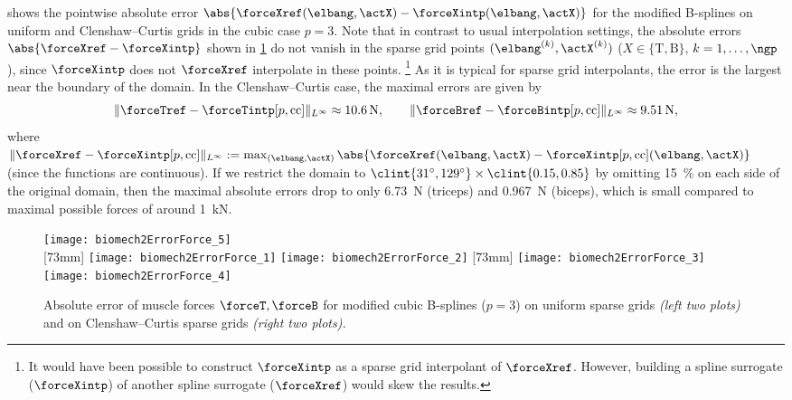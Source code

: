  shows the pointwise absolute error
$\abs{\forceXref(\elbang, \actX) - \forceXintp(\elbang, \actX)}$
for the modified B-splines on uniform and Clenshaw--Curtis grids
in the cubic case $p = 3$.
Note that in contrast to usual interpolation settings,
the absolute errors $\abs{\forceXref - \forceXintp}$
shown in \cref{fig:biomech2ErrorForce} do not vanish in the
sparse grid points $(\elbang^{(k)}, \actX^{(k)})$
($X \in \{\mathrm{T}, \mathrm{B}\}$, $k = 1, \dotsc, \ngp$),
since $\forceXintp$ does not $\forceXref$ interpolate
in these points.%
\footnote{%
  It would have been possible to construct $\forceXintp$
  as a sparse grid interpolant of $\forceXref$.
  However, building a spline surrogate ($\forceXintp$)
  of another spline surrogate ($\forceXref$) would skew the results.%
}
As it is typical for sparse grid interpolants,
the error is the largest near the boundary of the domain.
In the Clenshaw--Curtis case, the maximal errors are given by
\begin{equation}
  \norm[\Linfty]{\forceTref - \forceTintp[p,\cc]}
  \approx \SI{10.6}{\newton},\qquad
  \norm[\Linfty]{\forceBref - \forceBintp[p,\cc]}
  \approx \SI{9.51}{\newton},
\end{equation}
where $\norm[\Linfty]{\forceXref - \forceXintp[p,\cc]}
:= \max_{(\elbang, \actX)}
\abs{\forceXref(\elbang, \actX) - \forceXintp[p,\cc](\elbang, \actX)}$
(since the functions are continuous).
If we restrict the domain to
$\clint{\ang{31}, \ang{129}} \times \clint{0.15, 0.85}$
by omitting \SI{15}{\percent} on each side of the original domain,
then the maximal absolute errors drop to only
\SI{6.73}{\newton} (triceps) and \SI{0.967}{\newton} (biceps),
which is small compared to maximal possible forces of
around \SI{1}{\kilo\newton}.

\begin{figure}
  \texttt{[image: biomech2ErrorForce\_5]}%
  \\[2mm]%
  [73mm]{%
    \texttt{[image: biomech2ErrorForce\_1]}%
    \hfill%
    \texttt{[image: biomech2ErrorForce\_2]}%
  }%
  \hfill%
  [73mm]{%
    \texttt{[image: biomech2ErrorForce\_3]}%
    \hfill%
    \texttt{[image: biomech2ErrorForce\_4]}%
  }%
  \caption[Absolute error of muscle forces]{%
    Absolute error of muscle forces $\forceT, \forceB$ for
    modified cubic B-splines ($p = 3$)
    on uniform sparse grids \emph{(left two plots)} and
    on Clenshaw--Curtis sparse grids \emph{(right two plots).}%
  }%
  \label{fig:biomech2ErrorForce}%
\end{figure}

